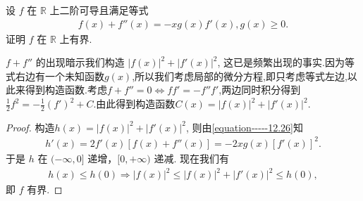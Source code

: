 \documentclass[../../main.tex]{subfiles}%
\begin{document}
\begin{example}
设 $f$ 在 $\mathbb{R}$ 上二阶可导且满足等式
\begin{align}\label{equation-----12.26}
f(x)+f''(x)=-xg(x)f'(x),g(x)\geqslant0.
\end{align}
证明 $f$ 在 $\mathbb{R}$ 上有界.
\end{example}
\begin{note}
$f + f''$ 的出现暗示我们构造 $|f(x)|^2 + |f'(x)|^2$, 这已是频繁出现的事实.因为等式右边有一个未知函数$g(x)$,所以我们考虑局部的微分方程,即只考虑等式左边,以此来得到构造函数.考虑$f+f''=0\Leftrightarrow ff'=-f''f'$,两边同时积分得到$\frac{1}{2}f^2=-\frac{1}{2}(f')^2+C$.由此得到构造函数$C(x)=|f(x)|^2+|f'(x)|^2$.
\end{note}
\begin{proof}
构造$h(x)=|f(x)|^2 + |f'(x)|^2$, 则由\eqref{equation-----12.26}知
\begin{align*}
h'(x)=2f'(x)[f(x)+f''(x)]=-2xg(x)[f'(x)]^2.
\end{align*}
于是 $h$ 在 $(-\infty,0]$ 递增，$[0,+\infty)$ 递减.
现在我们有
\begin{align*}
h(x)\leqslant h(0)\Longrightarrow |f(x)|^2\leqslant |f(x)|^2+|f' (x)|^2\leqslant h(0),
\end{align*}
即 $f$ 有界. 
\end{proof}
\end{document}
